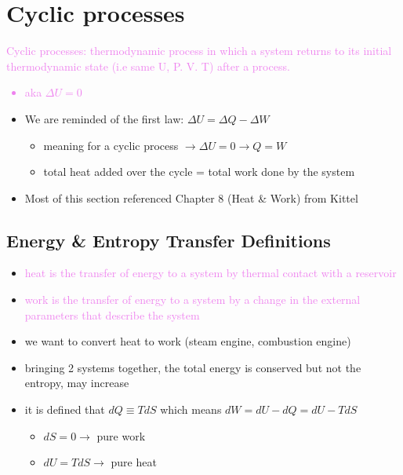 
\section{Cyclic processes}

\textcolor{violet}{Cyclic processes: thermodynamic process in which a system returns to its initial
	thermodynamic state (i.e same U, P. V. T) after a process.
	\begin{itemize}
		\item aka $\Delta U = 0$
	\end{itemize}
}
\begin{itemize}
	\item We are reminded of the first law: $\Delta U = \Delta Q - \Delta W$
	      \begin{itemize}
		      \item meaning for a cyclic process  $\rightarrow \Delta U = 0 \rightarrow Q = W$
		      \item total heat added over the cycle = total work done by the system
	      \end{itemize}
	\item Most of this section referenced Chapter 8 (Heat \& Work) from Kittel
\end{itemize}


\subsection{Energy \& Entropy Transfer Definitions}
\begin{itemize}
	\item \textcolor{violet}{heat is the transfer of energy to a system by thermal contact
		      with a reservoir}
	\item \textcolor{violet}{work is the transfer of energy to a system by a change in the
		      external parameters that describe the system}
	\item we want to convert heat to work (steam engine, combustion engine)
	\item bringing 2 systems together, the total energy is conserved but not the entropy,
	      may increase
	\item it is defined that $dQ \equiv T dS$ which means $dW = dU - dQ = dU - TdS$
	      \begin{itemize}
		      \item $dS = 0 \rightarrow$ pure work
		      \item $dU = TdS \rightarrow$ pure heat
	      \end{itemize}
\end{itemize}


